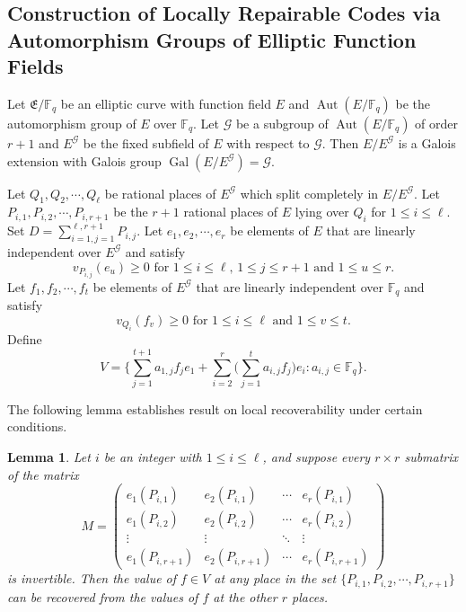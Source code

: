 \documentclass[journal,12pt,onecolumn]{IEEEtran}
\newtheorem{lemma}{Lemma}
\begin{document}
\subsection{Construction of Locally Repairable Codes via Automorphism Groups of Elliptic Function Fields}\label{lrc_framework}

Let $\mathfrak{E}/\mathbb{F}_q$ be an elliptic curve with function field $E$ and $\operatorname{Aut}(E/\mathbb{F}_q)$ be the automorphism group of $E$ over $\mathbb{F}_q$. Let $\mathcal{G}$ be a subgroup of $\operatorname{Aut}(E/\mathbb{F}_q)$ of order $r+1$ and $E^{\mathcal{G}}$ be the fixed subfield of $E$ with respect to $\mathcal{G}$. Then $E/E^{\mathcal{G}}$ is a Galois extension with Galois group $\operatorname{Gal}(E/E^{\mathcal{G}})=\mathcal{G}$.

Let $Q_1,Q_2,\cdots,Q_\ell$ be rational places of $E^{\mathcal{G}}$ which split completely in $E/E^{\mathcal{G}}$. Let $P_{i,1},P_{i,2},\cdots,P_{i,r+1}$ be the $r+1$ rational places of $E$ lying over $Q_i$ for $1\le i\le \ell$. Set $D = \sum_{i=1,j=1}^{\ell,r+1}P_{i,j}$. Let $e_1,e_2,\cdots,e_r$ be elements of $E$ that are linearly independent over $E^{\mathcal{G}}$ and satisfy
\[
    v_{P_{i,j}}(e_u)\ge0 \text{ for } 1\le i\le \ell,\,1\le j\le r+1 \text{ and }1\le u\le r.
\]
Let $f_1,f_2,\cdots,f_t$ be elements of $E^{\mathcal{G}}$ that are linearly independent over $\mathbb{F}_q$ and satisfy
\[
    v_{Q_i}(f_v)\ge0\text{ for }1\le i\le \ell\text{ and }1\le v\le t.
\]
Define
\begin{equation}\label{func}
    V=\Bigg\{ \sum_{j=1}^{t+1}a_{1,j}f_je_1+\sum_{i=2}^r\bigg(\sum_{j=1}^{t}a_{i,j}f_j\bigg)e_i:a_{i,j}\in\mathbb{F}_q \Bigg\}.
\end{equation}

The following lemma establishes result on local recoverability under certain conditions.

\begin{lemma}\label{local}\cite[Prop. 4.2]{Locally_Recoverable_Codes_from_Algebraic_Curves_and_Surfaces}
    Let $i$ be an integer with $1\le i\le \ell$, and suppose every $r\times r$ submatrix of the matrix 
    \[
        M=\begin{pmatrix}
        e_1(P_{i,1}) & e_2(P_{i,1}) & \cdots & e_r(P_{i,1}) \\
        e_1(P_{i,2}) & e_2(P_{i,2}) & \cdots & e_r(P_{i,2}) \\
        \vdots & \vdots & \ddots & \vdots \\
        e_1(P_{i,r+1}) & e_2(P_{i,r+1}) & \cdots & e_r(P_{i,r+1})
        \end{pmatrix}
    \]
    is invertible. Then the value of $f\in V$ at any place in the set $\{P_{i,1},P_{i,2},\cdots,P_{i,r+1}\}$ can be recovered from the values of $f$ at the other $r$ places.
\end{lemma}
\end{document}
